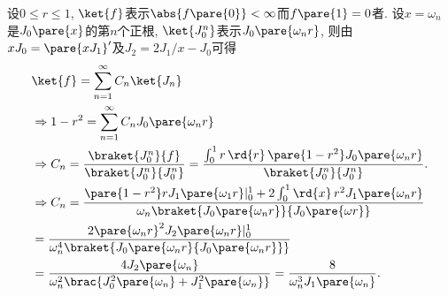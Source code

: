 \documentclass[hidelinks]{ctexart}
\begin{document}
\begin{sample}
    \begin{ex}
        设$0\le r\le 1$, $\ket{f}$表示$\abs{f\pare{0}} < \infty$而$f\pare{1} = 0$者. 设$x = \omega_n$是$J_0\pare{x}$的第$n$个正根, $\ket{J_0^n}$表示$J_0\pare{\omega_n r}$, 则由$xJ_0 = \pare{xJ_1}'$及$J_2 = 2J_1/x - J_0$可得
        \begin{align*}
            & \ket{f} = \sum_{n=1}^\infty C_n \ket{J_n} \\
            & \Rightarrow 1-r^2 = \sum_{n=1}^\infty C_n J_0\pare{\omega_n r} \\
            & \Rightarrow C_n = \frac{\braket{J_0^n}{f}}{\braket{J_0^n}{J_0^n}} = \frac{\int_0^1r\,\rd{r}\,\pare{1-r^2}J_0\pare{\omega_n r}}{\braket{J_0^n}{J_0^n}}. \\
            &\Rightarrow  C_n = \frac{\pare{1-r^2}rJ_1\pare{\omega_1 r}\vert_0^1 + 2\int_0^1\rd{x}\,r^2 J_1\pare{\omega_n r}}{\omega_n \braket{J_0\pare{\omega_n r}}{J_0\pare{\omega r}}} \\
            & =  \frac{2\pare{\omega_n r}^2J_2\pare{\omega_n r}\vert_0^1}{\omega_n^4 \braket{J_0\pare{\omega_n r}{J_0\pare{\omega_n r}}}}\\
            & = \frac{4J_2\pare{\omega_n}}{\omega_n^2\brac{J_0^2\pare{\omega_n}+J_1^2\pare{\omega_n}}} = \frac{8}{\omega_n^3 J_1\pare{\omega_n}}.
        \end{align*}
    \end{ex}
\end{sample}



\end{document}
